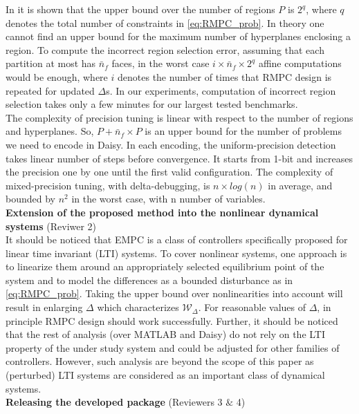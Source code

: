 {In \cite{Alessio2009} it is shown that the upper bound over the number of regions $P$ is $2^q$, where $q$ denotes the total number of constraints in \autoref{eq:RMPC_prob}. In theory one cannot find an upper bound for the maximum number of hyperplanes enclosing a region. To compute the incorrect region selection error, assuming that each partition at most has $\bar n_f$ faces, in the worst case $i\times\bar n_f\times 2^q$ affine computations would be enough, where $i$ denotes the number of times that RMPC design is repeated for updated $\Delta$s. In our experiments, computation of incorrect region selection takes only a few minutes for our largest tested benchmarks. %
\\
The complexity of precision tuning is linear with respect to the number of regions and hyperplanes. So, $P+\bar n_f\times P$ is an upper bound for the number of problems we need to encode in Daisy.
In each encoding, the uniform-precision detection takes linear number of steps before convergence. It starts from 1-bit and increases the precision one by one until the first valid configuration. The complexity of mixed-precision tuning, with delta-debugging, is $n\times log(n)$ in average, and bounded by $n^2$ in the worst case, with n number of variables.\\
\textbf{Extension of the proposed method into the nonlinear dynamical systems} (Reviwer 2)\\
It should be noticed that EMPC is a class of controllers specifically proposed for linear time invariant (LTI) systems. To cover nonlinear systems, one approach is to linearize them around an appropriately selected equilibrium point of the system and to model the differences as a bounded disturbance as in \autoref{eq:RMPC_prob}. Taking the upper bound over nonlinearities into account will result in enlarging $\Delta$ which characterizes $\mathcal{W}_{\Delta}$. For reasonable values of $\Delta$, in principle RMPC design should work successfully. Further, it should be noticed that the rest of analysis (over MATLAB and Daisy) do not rely on the LTI property of the under study system and could be adjusted for other families of controllers. However, such analysis are beyond the scope of this paper as (perturbed) LTI systems are considered as an important class of dynamical systems.\\ 
\textbf{Releasing the developed package} (Reviewers 3 $\&$ 4)\\
}
